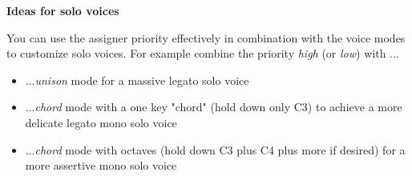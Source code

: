 \textbf{Ideas for solo voices}

You can use the assigner priority effectively in combination with the voice modes to customize solo voices. For example combine the priority \textit{high} (or \textit{low}) with ...
\begin{itemize}
  \item ...\textit{unison} mode for a massive legato solo voice
  \item ...\textit{chord} mode with a one key "chord" (hold down only C3) to achieve a more delicate legato mono solo voice
  \item ...\textit{chord} mode with octaves (hold down C3 plus C4 plus more if desired) for a more assertive mono solo voice   
\end{itemize}

